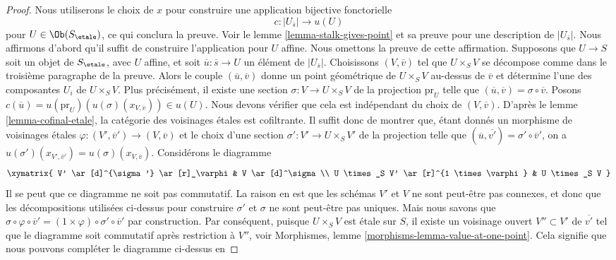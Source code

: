 \begin{proof}
\medskip\noindent
Nous utiliserons le choix de $x$ pour construire une application bijective fonctorielle
$$
c : |U_{\overline{s}}| \longrightarrow u(U)
$$
pour $U \in \Ob(S_\etale)$, ce qui conclura la preuve. Voir le
lemme \ref{lemma-stalk-gives-point}
et sa preuve pour une description de $|U_{\overline{s}}|$.
Nous affirmons d'abord qu'il suffit de construire l'application pour $U$ affine.
Nous omettons la preuve de cette affirmation.
Supposons que $U \to S$ soit un objet de $S_\etale$, avec $U$ affine, et soit
$\overline{u} : \overline{s} \to U$ un \'el\'ement de $|U_{\overline{s}}|$.
Choisissons $(V, \overline{v})$ tel que $U \times_S V$ se d\'ecompose
comme dans le troisi\`eme paragraphe de la preuve.
Alors le couple $(\overline{u}, \overline{v})$ donne un point g\'eom\'etrique de
$U \times_S V$ au-dessus de $\overline{v}$ et d\'etermine l'une des
composantes $U_i$ de $U \times_S V$. Plus pr\'ecis\'ement, il existe
une section $\sigma : V \to U \times_S V$ de la projection $\text{pr}_U$
telle que $(\overline{u}, \overline{v}) = \sigma \circ \overline{v}$. Posons
$c(\overline{u}) = u(\text{pr}_U)(u(\sigma)(x_{V, \overline{v}})) \in u(U)$.
Nous devons v\'erifier que cela est ind\'ependant du choix de $(V, \overline{v})$. D'apr\`es le
lemme \ref{lemma-cofinal-etale},
la cat\'egorie des voisinages \'etales est cofiltrante.
Il suffit donc de montrer
que, \'etant donn\'es un morphisme de voisinages \'etales
$\varphi : (V', \overline{v}') \to (V, \overline{v})$ et le choix d'une
section $\sigma' : V' \to U \times_S V'$ de la projection telle que
$(\overline{u}, \overline{v'}) = \sigma' \circ \overline{v}'$,
on a $u(\sigma')(x_{V', \overline{v}'}) = u(\sigma)(x_{V, \overline{v}})$.
Consid\'erons le diagramme
$$
\xymatrix{
V' \ar[d]^{\sigma'} \ar[r]_\varphi & V \ar[d]^\sigma \\
U \times_S V' \ar[r]^{1 \times \varphi} &
U \times_S V
}
$$
Il se peut que ce diagramme ne soit pas commutatif. La raison en est
que les sch\'emas $V'$ et $V$ ne sont peut-\^etre pas connexes, et donc que
les d\'ecompositions utilis\'ees ci-dessus pour construire $\sigma'$ et $\sigma$ ne sont
peut-\^etre pas uniques. Mais nous savons que
$\sigma \circ \varphi \circ \overline{v}' =
(1 \times \varphi) \circ \sigma' \circ \overline{v}'$
par construction. Par cons\'equent, puisque $U \times_S V$ est \'etale sur $S$,
il existe un voisinage ouvert
$V'' \subset V'$ de $\overline{v'}$ tel que le diagramme
soit commutatif apr\`es restriction \`a $V''$, voir
Morphismes, lemme \ref{morphisms-lemma-value-at-one-point}.
Cela signifie que nous pouvons compl\'eter le diagramme ci-dessus en

\end{proof}
